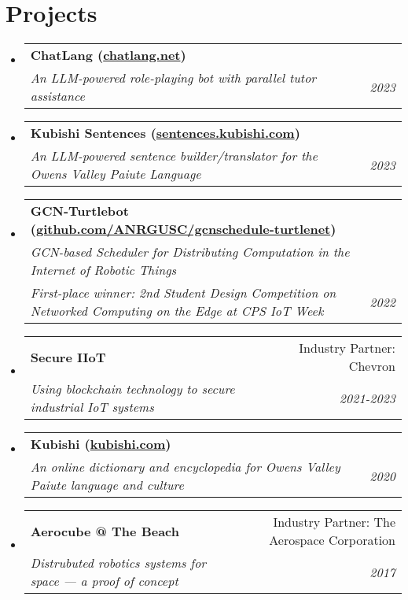 \documentclass[letterpaper,11pt]{article}
\makeatletter
\newcommand{\resumeSubheading}[4]{
  \vspace{-1pt}\item[]
    \begin{tabular*}{0.97\textwidth}{l@{\extracolsep{\fill}}r}
      \textbf{#1} & #2 \\
      \textit{\small#3} & \textit{\small #4} \\
    \end{tabular*}\vspace{-5pt}
}
\newcommand{\resumeSubheadingTwo}[6]{
  \vspace{-1pt}\item[]
    \begin{tabular*}{0.97\textwidth}{l@{\extracolsep{\fill}}r}
      \textbf{#1} & #2 \\
      \textit{\small#3} & \textit{\small #4} \\
      \textit{\small#5} & \textit{\small #6}
    \end{tabular*}\vspace{-5pt}
}
\newcommand{\resumeSubHeadingListStart}{\begin{itemize}[leftmargin=*]}
\newcommand{\resumeSubHeadingListEnd}{\end{itemize}}
\makeatother
\begin{document}
\section{Projects}
    \resumeSubHeadingListStart
    \resumeSubheading
    {ChatLang (\href{https://chatlang.net}{chatlang.net})}{}
    {An LLM-powered role-playing bot with parallel tutor assistance}{2023}

    \resumeSubheading
    {Kubishi Sentences (\href{https://sentences.kubishi.com}{sentences.kubishi.com})}{}
    {An LLM-powered sentence builder/translator for the Owens Valley Paiute Language}{2023}

    \resumeSubheadingTwo
    {GCN-Turtlebot (\href{https://github.com/ANRGUSC/gcnschedule-turtlenet}{github.com/ANRGUSC/gcnschedule-turtlenet})}{}
    {GCN-based Scheduler for Distributing Computation in the Internet of Robotic Things}{}
    {First-place winner: 2nd Student Design Competition on Networked Computing on the Edge at CPS IoT Week}{2022}

    \resumeSubheading
    {Secure IIoT}{Industry Partner: Chevron}
    {Using blockchain technology to secure industrial IoT systems}{2021-2023}

    \resumeSubheading
    {Kubishi (\href{https://kubishi.com}{kubishi.com})}{}
    {An online dictionary and encyclopedia for Owens Valley Paiute language and culture}{2020}
    
    \resumeSubheading
    {Aerocube @ The Beach}{Industry Partner: The Aerospace Corporation}
    {Distrubuted robotics systems for space --- a proof of concept}{2017}
\resumeSubHeadingListEnd

\end{document}
